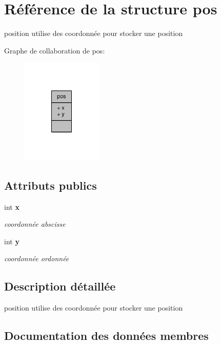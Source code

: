 \section{Référence de la structure pos}
\label{structpos}


position utilise des coordonnée pour stocker une position  




Graphe de collaboration de pos\-:\nopagebreak
\begin{figure}[H]
\begin{center}
\leavevmode
\includegraphics[width=108pt]{structpos__coll__graph}
\end{center}
\end{figure}
\subsection*{Attributs publics}
\begin{DoxyCompactItemize}
\item 
int {\bf x}
\begin{DoxyCompactList}\small\item\em coordonnée abscisse \end{DoxyCompactList}\item 
int {\bf y}
\begin{DoxyCompactList}\small\item\em coordonnée ordonnée \end{DoxyCompactList}\end{DoxyCompactItemize}


\subsection{Description détaillée}
position utilise des coordonnée pour stocker une position 

\subsection{Documentation des données membres}
